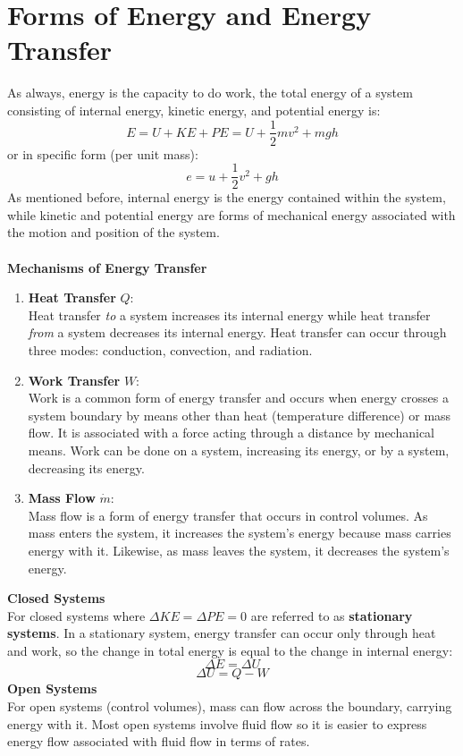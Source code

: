 \documentclass[12pt]{article}
\begin{document}
\section*{Forms of Energy and Energy Transfer}
As always, energy is the capacity to do work, the total energy of a system consisting of internal energy, kinetic energy, and potential energy is:
\[E = U + KE + PE = U + \frac{1}{2}mv^2 + mgh\]
or in specific form (per unit mass):
\[e = u + \frac{1}{2}v^2 + gh\]
As mentioned before, internal energy is the energy contained within the system, while kinetic and potential energy are forms of mechanical energy associated with the motion and position of the system.\\\\
\textbf{Mechanisms of Energy Transfer}
\begin{enumerate}
    \item \textbf{Heat Transfer} $Q$:\\
    Heat transfer \textit{to} a system increases its internal energy while heat transfer \textit{from} a system decreases its internal energy. Heat transfer can occur through three modes: conduction, convection, and radiation.
    \item \textbf{Work Transfer} $W$:\\
    Work is a common form of energy transfer and occurs when energy crosses a system boundary by means other than heat (temperature difference) or mass flow. It is associated with a force acting through a distance by mechanical means. Work can be done on a system, increasing its energy, or by a system, decreasing its energy.
    \item \textbf{Mass Flow} $\dot{m}$:\\
    Mass flow is a form of energy transfer that occurs in control volumes. As mass enters the system, it increases the system's energy because mass carries energy with it. Likewise, as mass leaves the system, it decreases the system's energy.
\end{enumerate}
\textbf{Closed Systems}\\
For closed systems where $\Delta KE = \Delta PE = 0$ are referred to as \textbf{stationary systems}. In a stationary system, energy transfer can occur only through heat and work, so the change in total energy is equal to the change in internal energy:
\[\Delta E = \Delta U\]
\[\boxed{\Delta U = Q - W}\]
\textbf{Open Systems}\\
For open systems (control volumes), mass can flow across the boundary, carrying energy with it. Most open systems involve fluid flow so it is easier to express energy flow associated with fluid flow in terms of rates.\\\\
\end{document}
